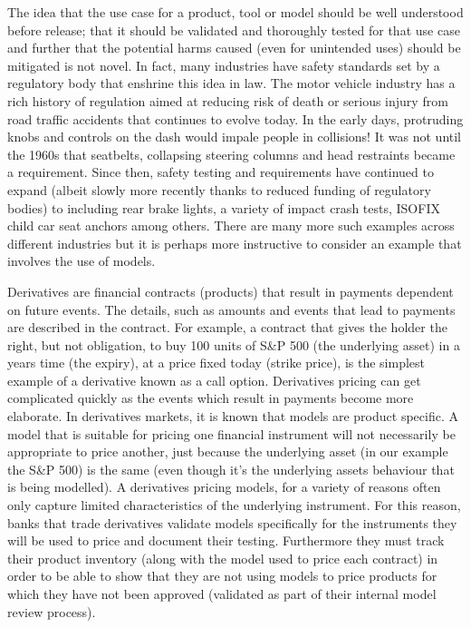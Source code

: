 The idea that the use case for a product, tool or model should be well understood before release; that it should be validated and thoroughly tested for that use case and further that the potential harms caused (even for unintended uses) should be mitigated is not novel. In fact, many industries have safety standards set by a regulatory body that enshrine this idea in law. The motor vehicle industry has a rich history of regulation aimed at reducing risk of death or serious injury from road traffic accidents that continues to evolve today. In the early days, protruding knobs and controls on the dash would impale people in collisions! It was not until the 1960s that seatbelts, collapsing steering columns and head restraints became a requirement. Since then, safety testing and requirements have continued to expand (albeit slowly more recently thanks to reduced funding of regulatory bodies) to including rear brake lights, a variety of impact crash tests, ISOFIX child car seat anchors among others. There are many more such examples across different industries but it is perhaps more instructive to consider an example that involves the use of models.

Derivatives are financial contracts (products) that result in payments dependent on future events. The details, such as amounts and events that lead to payments are described in the contract. For example, a contract that gives the holder the right, but not obligation, to buy 100 units of S\&P 500 (the underlying asset) in a years time (the expiry), at a price fixed today (strike price), is the simplest example of a derivative known as a call option. Derivatives pricing can get complicated quickly as the events which result in payments become more elaborate. In derivatives markets, it is known that models are product specific. A model that is suitable for pricing one financial instrument will not necessarily be appropriate to price another, just because the underlying asset (in our example the S\&P 500) is the same (even though it's the underlying assets behaviour that is being modelled). A derivatives pricing models, for a variety of reasons often only capture limited characteristics of the underlying instrument. For this reason, banks that trade derivatives validate models specifically for the instruments they will be used to price and document their testing. Furthermore they must track their product inventory (along with the model used to price each contract) in order to be able to show that they are not using models to price products for which they have not been approved (validated as part of their internal model review process).

